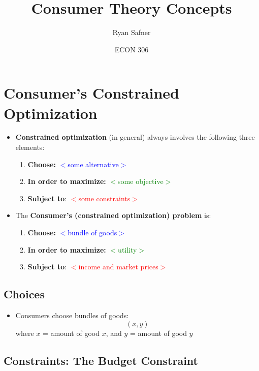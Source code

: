 \documentclass{article}
\title{Consumer Theory Concepts}
\author{Ryan Safner}
\date{ECON 306}
\begin{document}
\maketitle

\section*{Consumer's Constrained Optimization}

\begin{itemize}
	\item \textbf{Constrained optimization} (in general) always involves the following three elements: 
	\begin{enumerate}
		\item \textbf{Choose:} \textcolor{blue}{$<$some alternative$>$}
		\item \textbf{In order to maximize:} \textcolor{green}{$<$some objective$>$}
		\item \textbf{Subject to}: \textcolor{red}{$<$some constraints$>$}
	\end{enumerate}
	\item The \textbf{Consumer's (constrained optimization) problem} is:  
	\begin{enumerate}
		\item \textbf{Choose:} \textcolor{blue}{$<$bundle of goods$>$}
		\item \textbf{In order to maximize:} \textcolor{green}{$<$utility$>$}
		\item \textbf{Subject to}: \textcolor{red}{$<$income and market prices$>$}
	\end{enumerate}

\end{itemize}

\subsection*{Choices}
\begin{itemize}
	\item Consumers choose bundles of goods:
	\begin{equation*}
	(x,y)	
	\end{equation*}
	where $x$ = amount of good $x$, and $y$ = amount of good $y$
\end{itemize}

\subsection*{Constraints: The Budget Constraint}
\end{document}
